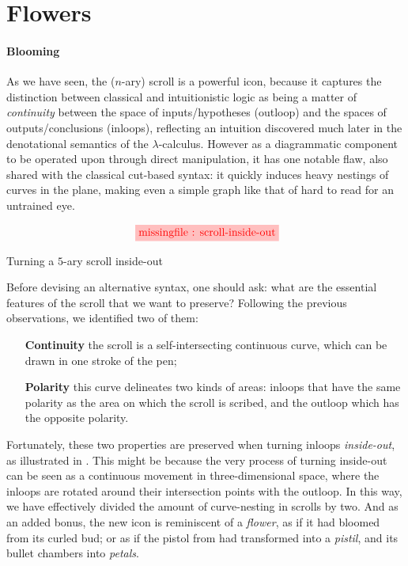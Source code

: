\section{Flowers}

\paragraph{Blooming}

As we have seen, the ($n$-ary) scroll is a powerful icon, because it captures
the distinction between classical and intuitionistic logic as being a matter of
\emph{continuity} between the space of inputs/hypotheses (outloop) and the
spaces of outputs/conclusions (inloops), reflecting an intuition discovered much
later in the denotational semantics of the $\lambda$-calculus. However as a
diagrammatic component to be operated upon through direct manipulation, it has
one notable flaw, also shared with the classical cut-based syntax: it quickly
induces heavy nestings of curves in the plane, making even a simple graph like
that of  hard to read for an untrained eye.

\begin{marginfigure}
  $$
  \tikzfig{1}{0.4}{scroll-inside-out}
  $$
  \caption{Turning a $5$-ary scroll inside-out}
\end{marginfigure}

Before devising an alternative syntax, one should ask: what are the essential
features of the scroll that we want to preserve? Following the previous
observations, we identified two of them:
\begin{itemize}
  \item[\textbf{Continuity}] the scroll is a self-intersecting continuous curve,
  which can be drawn in one stroke of the pen;
  \item[\textbf{Polarity}] this curve delineates two kinds of areas: inloops that have
  the same polarity as the area on which the scroll is scribed, and the outloop
  which has the opposite polarity.
\end{itemize}

Fortunately, these two properties are preserved when turning inloops
\emph{inside-out}, as illustrated in . This might be
because the very process of turning inside-out can be seen as a continuous
movement in three-dimensional space, where the inloops are rotated around their
intersection points with the outloop. In this way, we have effectively divided
the amount of curve-nesting in scrolls by two. And as an added bonus, the new
icon is reminiscent of a \emph{flower}, as if it had bloomed from its curled
bud; or as if the pistol from  had transformed into a
\emph{pistil}, and its bullet chambers into \emph{petals}.

